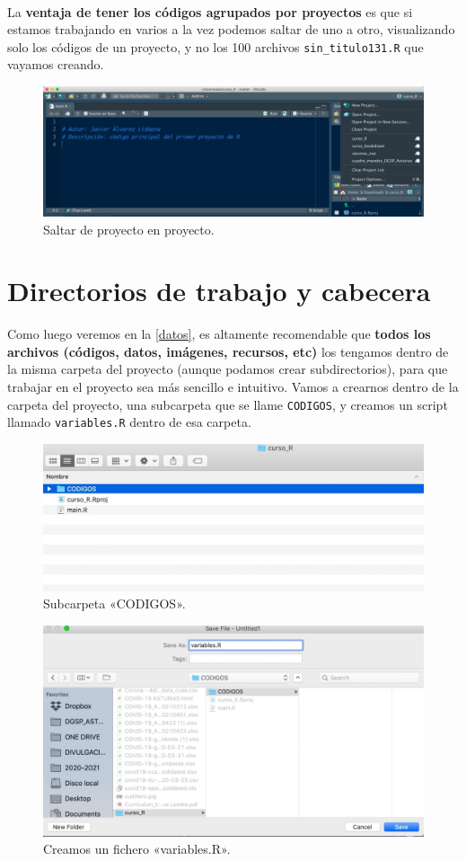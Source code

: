 \documentclass[11pt,]{book}
\begin{document}
~

La \textbf{ventaja de tener los códigos agrupados por proyectos} es que si estamos trabajando en varios a la vez podemos saltar de uno a otro, visualizando solo los códigos de un proyecto, y no los 100 archivos \texttt{sin\_titulo131.R} que vayamos creando.

\begin{figure}

{\centering \includegraphics[width=0.5\linewidth]{./img/crear_proyecto9} 

}

\caption{Saltar de proyecto en proyecto.}\label{fig:crear-proyecto9}
\end{figure}

\hypertarget{directorios-de-trabajo-y-cabecera}{%
\section{Directorios de trabajo y cabecera}\label{directorios-de-trabajo-y-cabecera}}

Como luego veremos en la \ref{datos}, es altamente recomendable que \textbf{todos los archivos (códigos, datos, imágenes, recursos, etc)} los tengamos dentro de la misma carpeta del proyecto (aunque podamos crear subdirectorios), para que trabajar en el proyecto sea más sencillo e intuitivo. Vamos a crearnos dentro de la carpeta del proyecto, una subcarpeta que se llame \texttt{CODIGOS}, y creamos un script llamado \texttt{variables.R} dentro de esa carpeta.

\begin{figure}

{\centering \includegraphics[width=0.5\linewidth]{./img/carpeta_codigos} 

}

\caption{Subcarpeta «CODIGOS».}\label{fig:carpeta-codigos}
\end{figure}

\begin{figure}

{\centering \includegraphics[width=0.5\linewidth]{./img/carpeta_codigos1} 

}

\caption{Creamos un fichero «variables.R».}\label{fig:carpeta-codigos1}
\end{figure}
\end{document}
